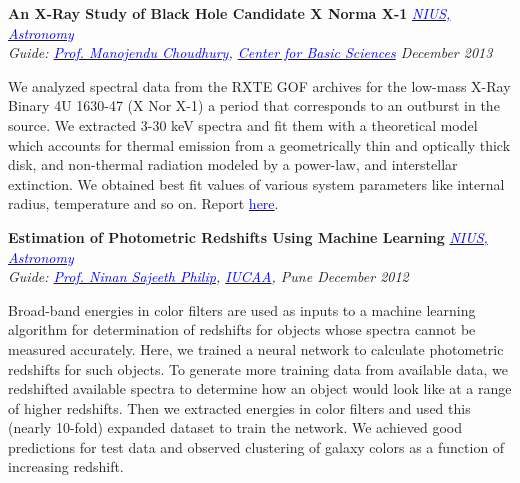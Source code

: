 \documentclass[margin,line]{res}
\newenvironment{list1}{
  \begin{list}{\ding{113}}{%
      \setlength{\itemsep}{0in}
      \setlength{\parsep}{0in} \setlength{\parskip}{0in}
      \setlength{\topsep}{0in} \setlength{\partopsep}{0in} 
      \setlength{\leftmargin}{0.17in}}}{\end{list}}
\begin{document}
\begin{resume}
{\bf An X-Ray Study of Black Hole Candidate X Norma X-1} \hfill \textit{\href{http://nius.hbcse.tifr.res.in/}{\textcolor{blue} {NIUS, Astronomy}}} \\
{\em Guide: \href{http://cbs.ac.in/people/visiting-scientists/manojendu-choudhury}{\textcolor{blue}{Prof. Manojendu Choudhury}}, \href{http://cbs.ac.in/}{\textcolor{blue} {Center for Basic Sciences}} \hfill December 2013} \\
\vspace*{-.15in}
\begin{list1}
\item[] We analyzed spectral data from the RXTE GOF archives for the low-mass X-Ray Binary 4U 1630-47 (X Nor X-1) a period that corresponds to an outburst in the source. We extracted 3-30 keV spectra and fit them with a theoretical model which accounts for thermal emission from a geometrically thin and optically thick disk, and non-thermal radiation modeled by a power-law, and interstellar extinction. We obtained best fit values of various system parameters like internal radius, temperature and so on. Report \href{https://alankarkotwal.github.io/4U_1630-47_Report.pdf}{\textcolor{blue} {here}}.
\end{list1}

\vspace*{-0.1in}

{\bf Estimation of Photometric Redshifts Using Machine Learning} \hfill \textit{\href{http://nius.hbcse.tifr.res.in/}{\textcolor{blue} {NIUS, Astronomy}}} \\
{\em Guide: \href{http://www.iucaa.ernet.in/~nspp/}{\textcolor{blue}{Prof. Ninan Sajeeth Philip}}, \href{http://www.iucaa.ernet.in/}{\textcolor{blue} {IUCAA}}, Pune \hfill December 2012} \\
\vspace*{-.15in}
\begin{list1}
\item[] Broad-band energies in color filters are used as inputs to a machine learning algorithm for determination of redshifts for objects whose spectra cannot be measured accurately. Here, we trained a neural network to calculate photometric redshifts for such objects. To generate more training data from available data, we redshifted available spectra to determine how an object would look like at a range of higher redshifts. Then we extracted energies in color filters and used this (nearly 10-fold) expanded dataset to train the network. We achieved good predictions for test data and observed clustering of galaxy colors as a function of increasing redshift.
\end{list1}


\end{resume}
\end{document}

